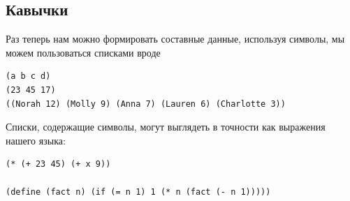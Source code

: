\subsection{Кавычки}
\label{QUOTATION}

Раз теперь нам можно формировать составные данные,
используя символы, мы можем пользоваться списками вроде

\begin{Verbatim}[fontsize=\small]
(a b c d)
(23 45 17)
((Norah 12) (Molly 9) (Anna 7) (Lauren 6) (Charlotte 3))
\end{Verbatim}
Списки, содержащие символы, могут выглядеть в точности как выражения
нашего языка:

\begin{Verbatim}[fontsize=\small]
(* (+ 23 45) (+ x 9))

(define (fact n) (if (= n 1) 1 (* n (fact (- n 1)))))
\end{Verbatim}

